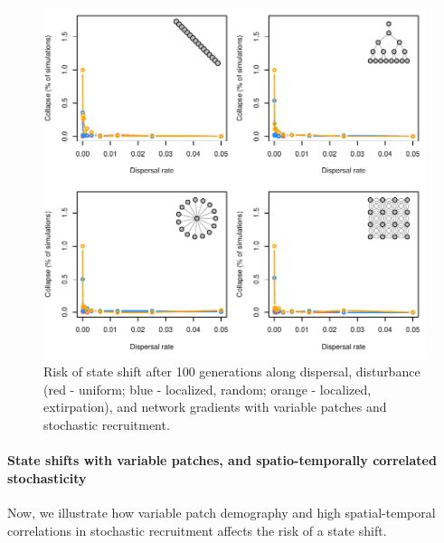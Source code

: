 \documentclass[]{article}
\let\oldparagraph\paragraph
\renewcommand{\paragraph}[1]{\oldparagraph{#1}\mbox{}}
\begin{document}
\begin{figure}[H]

{\centering \includegraphics{Managing_for_ecological_surprises_in_metapopulations_files/figure-latex/state shift with variable patches and stochasticity-1} 

}

\caption{Risk of state shift after 100 generations along dispersal, disturbance (red - uniform; blue - localized, random; orange - localized, extirpation), and network gradients with variable patches and stochastic recruitment.}\label{fig:state shift with variable patches and stochasticity}
\end{figure}
\newpage

\hypertarget{state-shifts-with-variable-patches-and-spatio-temporally-correlated-stochasticity}{%
\paragraph{State shifts with variable patches, and spatio-temporally
correlated
stochasticity}\label{state-shifts-with-variable-patches-and-spatio-temporally-correlated-stochasticity}}

Now, we illustrate how variable patch demography and high
spatial-temporal correlations in stochastic recruitment affects the risk
of a state shift.
\end{document}
